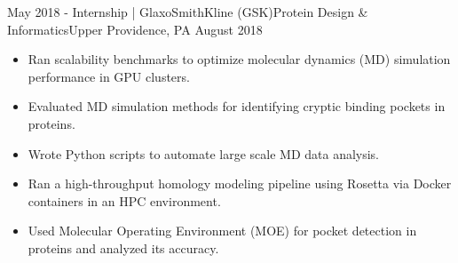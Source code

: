 \begin{experiences}
  \experience
    {May 2018 -} {Internship | GlaxoSmithKline (GSK)}{Protein Design \& Informatics}{Upper Providence, PA}
    {August 2018} {
        \begin{itemize}
        \item Ran scalability benchmarks to optimize molecular dynamics (MD) simulation performance in GPU clusters.
        \item Evaluated MD simulation methods for identifying cryptic binding pockets in proteins.
        \item Wrote Python scripts to automate large scale MD data analysis.
        \item Ran a high-throughput homology modeling pipeline using Rosetta via Docker containers in an HPC environment.
        \item Used Molecular Operating Environment (MOE) for pocket detection in proteins and analyzed its accuracy.
        \end{itemize}
    }






\end{experiences}
